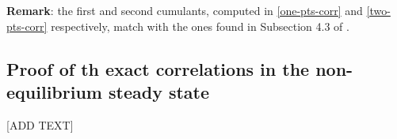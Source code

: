 \documentclass[10pt]{article}
\numberwithin{equation}{section}
\numberwithin{equation}{subsection}
\newcommand{\com}[1]{{ (* {\color{red}\small #1}*)}}
\begin{document}
\textbf{Remark}: the first and second cumulants, computed in \eqref{one-pts-corr} and \eqref{two-pts-corr} respectively, match with the ones found in Subsection 4.3 of \cite{vanicat2017exact}.
\begin{comment}
{\color{blue}We aim to find an explicit for for the steady state $|\Psi\rangle$. The MPA gives the steady state in terms of an abstract algebra of operators. If an explicit representation of $(X_{a})_{a=1,\ldots,N}$ was available, it would be possible to compute explicitly all the correlations and currents of particles for the Hamiltonian \eqref{hamiltonian}. Another way of computing this steady state, without passing through a representation, is using the commutators \eqref{bula} and the actions \eqref{leftBoundary} and \eqref{rightBoundary}. For the one and two point correlation and for the currents this has been done in \cite{vanicat2017exact}. Inspired by this last reference, in this subsection, we aim to find exact formulas for the steady state  $|\Psi\rangle$ using only the \eqref{bula}, \eqref{leftBoundary} and \eqref{rightBoundary}. In subsection \ref{correlation-section}, this result will leads to exact correlation for arbitrary number of particles of type $\{2,\ldots,N\}$. This aim will be achieved by the help of a similarity transformation $\mathcal{S}$ that makes commutation relations simpler, and allows to find the steady state $|\widetilde\Psi\rangle$ of a transformed Hamiltonian, denoted  $\mathbb{H}$, with lower-triangular left boundary and diagonal right boundary. Therefore, inverting this similarity, one can retrieve the steady state of \eqref{hamiltonian}. A fundamental 'ingredient' of these computation is duality, that has been proved in section~\ref{sectionDuality}. Indeed, the similarity transformation $\mathcal{S}$ relies on an "intermediate transformation" $V$ (see \eqref{transformationV}) that is, up to the diagonal operator $R$, the duality matrix.} \com{clarify}
\end{comment}
\subsection{Proof of th exact correlations in the non-equilibrium steady state}
[ADD TEXT]
\end{document}
